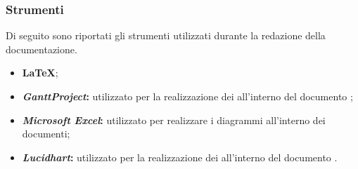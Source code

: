 \subsubsection{Strumenti} \label{Documentazione_Strumenti}
Di seguito sono riportati gli strumenti utilizzati durante la redazione della documentazione.
\begin{itemize}
	\item \textbf{\LaTeX};
	\item \textbf{\textit{GanttProject}:} utilizzato per la realizzazione dei  all'interno del documento ;
	\item \textbf{\textit{Microsoft Excel}:} utilizzato per realizzare i diagrammi all'interno dei documenti;
	\item \textbf{\textit{Lucidhart}:} utilizzato per la realizzazione dei  all'interno del documento .
\end{itemize}

